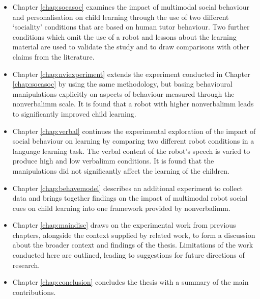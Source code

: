 \begin{itemize}
\item Chapter \ref{chap:socasoc} examines the impact of multimodal social behaviour and personalisation on child \gls{learning} through the use of two different `sociality' conditions that are based on human tutor behaviour. Two further conditions which omit the use of a robot and lessons about the \gls{learning} material are used to validate the study and to draw comparisons with other claims from the literature.

\item Chapter \ref{chap:nviexperiment} extends the experiment conducted in Chapter \ref{chap:socasoc} by using the same methodology, but basing behavioural manipulations explicitly on aspects of behaviour measured through the \gls{nonverbalimm} scale. It is found that a robot with higher \gls{nonverbalimm} leads to significantly improved child \gls{learning}.

\item Chapter \ref{chap:verbal} continues the experimental exploration of the impact of social behaviour on \gls{learning} by comparing two different robot conditions in a language learning task. The verbal content of the robot's speech is varied to produce high and low \gls{verbalimm} conditions. It is found that the manipulations did not significantly affect the \gls{learning} of the children.

\item Chapter \ref{chap:behavemodel} describes an additional experiment to collect data and brings together findings on the impact of multimodal robot social cues on child learning into one framework provided by \gls{nonverbalimm}.

\item Chapter \ref{chap:maindisc} draws on the experimental work from previous chapters, alongside the context supplied by related work, to form a discussion about the broader context and findings of the thesis. Limitations of the work conducted here are outlined, leading to suggestions for future directions of research.

\item Chapter \ref{chap:conclusion} concludes the thesis with a summary of the main contributions.

\end{itemize}